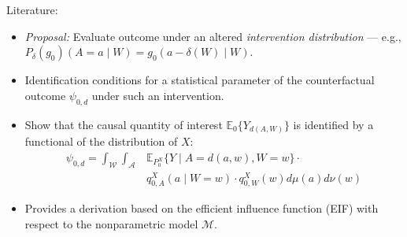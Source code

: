 \documentclass{beamer}
\newcommand{\E}{\mathbb{E}}
\begin{document}
\begin{frame}[c]{Literature: \cite{diaz2012population}}

\begin{center}
\begin{itemize}
  \itemsep10pt
  \item \textit{Proposal:} Evaluate outcome under an altered
    \textit{intervention distribution} --- e.g.,
    $P_{\delta}(g_0)(A = a \mid W) = g_0(a - \delta(W) \mid W)$.
  \item Identification conditions for a statistical parameter of the
    counterfactual outcome $\psi_{0,d}$ under such an intervention.
  \item Show that the causal quantity of interest $\E_0 \{Y_{d(A, W)}\}$ is
    identified by a functional of the distribution of $X$:
    \begin{align*}\label{eqn:identification2012}
      \psi_{0,d} = \int_{\mathcal{W}} \int_{\mathcal{A}} &\E_{P_0^X} \{Y \mid
        A = d(a, w), W = w\} \cdot \\ &q_{0, A}^X(a \mid W = w) \cdot
        q_{0, W}^X(w) d\mu(a)d\nu(w)
    \end{align*}
  \item Provides a derivation based on the efficient influence function (EIF)
    with respect to the nonparametric model $\mathcal{M}$.
\end{itemize}
\end{center}


\end{frame}
\end{document}
